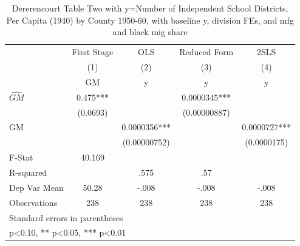 \begin{table}[htbp]\centering
\def\sym#1{\ifmmode^{#1}\else\(^{#1}\)\fi}
\caption{Dererencourt Table Two with y=Number of Independent School Districts, Per Capita (1940) by County 1950-60, with baseline y, division FEs, and mfg and black mig share}
\begin{tabular}{l*{4}{c}}
\toprule
                    & First Stage   &         OLS   &Reduced Form   &        2SLS   \\
                    &\multicolumn{1}{c}{(1)}&\multicolumn{1}{c}{(2)}&\multicolumn{1}{c}{(3)}&\multicolumn{1}{c}{(4)}\\
                    &\multicolumn{1}{c}{GM}&\multicolumn{1}{c}{y}&\multicolumn{1}{c}{y}&\multicolumn{1}{c}{y}\\
\midrule
$\hat{GM}$          &       0.475***&               &   0.0000345***&               \\
                    &    (0.0693)   &               &(0.00000887)   &               \\
\addlinespace
GM                  &               &   0.0000356***&               &   0.0000727***\\
                    &               &(0.00000752)   &               & (0.0000175)   \\
\midrule
F-Stat              &      40.169   &               &               &               \\
R-squared           &               &        .575   &         .57   &               \\
Dep Var Mean        &       50.28   &       -.008   &       -.008   &       -.008   \\
Observations        &         238   &         238   &         238   &         238   \\
\bottomrule
\multicolumn{5}{l}{\footnotesize Standard errors in parentheses}\\
\multicolumn{5}{l}{\footnotesize * p<0.10, ** p<0.05, *** p<0.01}\\
\end{tabular}
\end{table}
